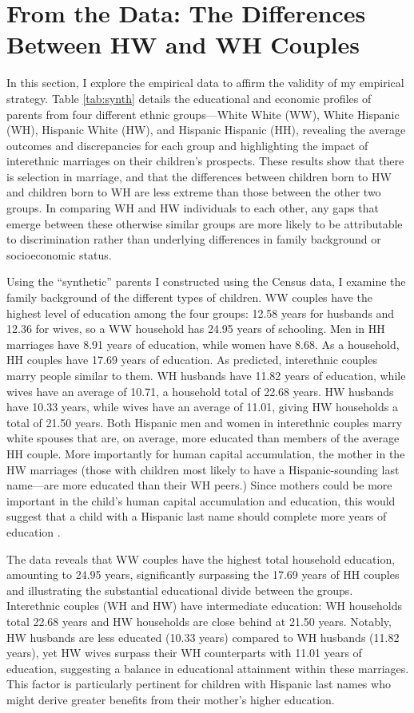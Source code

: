 \section{From the Data: The Differences Between HW and WH Couples}\label{sec:hw-wh-couples-data}

In this section, I explore the empirical data to affirm the validity of my empirical strategy. Table \ref{tab:synth} details the educational and economic profiles of parents from four different ethnic groups—White White (WW), White Hispanic (WH), Hispanic White (HW), and Hispanic Hispanic (HH), revealing the average outcomes and discrepancies for each group and highlighting the impact of interethnic marriages on their children’s prospects. These results show that there is selection in marriage, and that the differences between children born to HW and children born to WH are less extreme than those between the other two groups. In comparing WH and HW individuals to each other, any gaps that emerge between these otherwise similar groups are more likely to be attributable to discrimination rather than underlying differences in family background or socioeconomic status.

Using the “synthetic” parents I constructed using the Census data, I examine the family background of the different types of children. WW couples have the highest level of education among the four groups: 12.58 years  for husbands and 12.36 for wives, so a WW household has 24.95 years of schooling. Men in HH marriages have 8.91 years of education, while women have 8.68. As a household, HH couples have 17.69 years of education. As predicted, interethnic couples marry people similar to them. WH husbands have 11.82 years of education, while wives have an average of 10.71, a household total of 22.68 years. HW husbands have 10.33 years, while wives have an average of 11.01, giving HW households a total of 21.50 years. Both  Hispanic men and women in interethnic couples marry white spouses that are, on average, more educated than members of the average HH couple. More importantly for human capital accumulation, the mother in the HW marriages (those with children most likely to have a Hispanic-sounding last name—are more educated than their WH peers.) Since mothers could be more important in the child’s human capital accumulation and education, this would suggest that a child with a Hispanic last name should complete more years of education  \autocite{gould2020does}.

The data reveals that WW couples have the highest total household education, amounting to 24.95 years, significantly surpassing the 17.69 years of HH couples and illustrating the substantial educational divide between the groups. Interethnic couples (WH and HW) have intermediate education: WH households total 22.68 years and HW households are close behind at 21.50 years. Notably, HW husbands are less educated (10.33 years) compared to WH husbands (11.82 years), yet HW wives surpass their WH counterparts with 11.01 years of education, suggesting a balance in educational attainment within these marriages. This factor is particularly pertinent for children with Hispanic last names who might derive greater benefits from their mother’s higher education.

